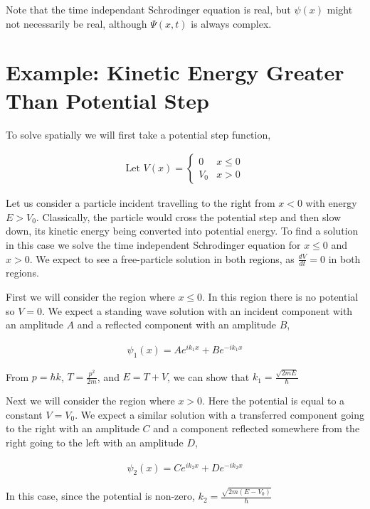 \documentclass[11pt]{amsart}
\begin{document}
Note that the time independant Schrodinger equation is real, but $\psi(x)$ might not necessarily be real, although $\Psi(x, t)$ is always complex.

\section{Example: Kinetic Energy Greater Than Potential Step}

To solve spatially we will first take a potential step function,

\begin{align*}
  \text{Let } V(x) =
  \begin{cases}
    0 & x \leq 0 \\
    V_0 & x > 0
  \end{cases}
\end{align*}

Let us consider a particle incident travelling to the right from $x < 0$ with energy $E > V_0$. Classically, the particle would cross the potential step and then slow down, its kinetic energy being converted into potential energy. To find a solution in this case we solve the time independent Schrodinger equation for $x \leq 0$ and $x > 0$. We expect to see a free-particle solution in both regions, as $\frac{dV}{dt} = 0$ in both regions.

First we will consider the region where $x \leq 0$. In this region there is no potential so $V = 0$. We expect a standing wave solution with an incident component with an amplitude $A$ and a reflected component with an amplitude $B$,

\begin{align*}
  \psi_1(x) = A e^{i k_1 x} + B e^{-i k_1 x}
\end{align*}

From $p = \hbar k$, $T = \frac{p^2}{2m}$, and $E = T + V$, we can show that $k_1 = \frac{\sqrt{2mE}}{\hbar}$

Next we will consider the region where $x > 0$. Here the potential is equal to a constant $V = V_0$. We expect a similar solution with a transferred component going to the right with an amplitude $C$ and a component reflected somewhere from the right going to the left with an amplitude $D$,

\begin{align*}
  \psi_2(x) = C e^{i k_2 x} + D e^{-i k_2 x}
\end{align*}

In this case, since the potential is non-zero, $k_2 = \frac{\sqrt{2m\left(E - V_0\right)}}{\hbar}$
\end{document}
